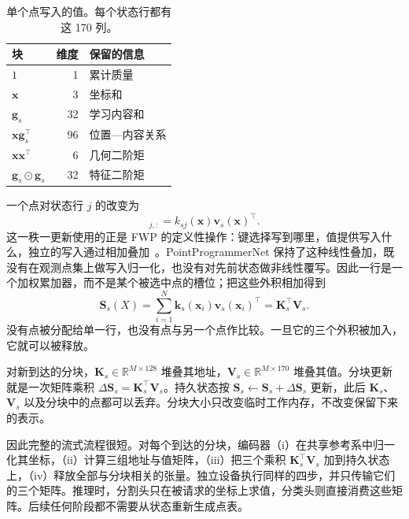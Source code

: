 \documentclass[UTF8,a4paper,11pt,fontset=windows]{ctexart}
\newcommand{\R}{\mathbb{R}}
\newcommand{\Sstate}{\mathbf{S}}
\begin{document}
\begin{table}[t]
\centering
\caption{单个点写入的值。每个状态行都有这 170 列。}
\label{tab:value-layout-cn}
\begin{tabular}{lrl}
\toprule
块 & 维度 & 保留的信息 \\
\midrule
$1$ & 1 & 累计质量 \\
$\bm x$ & 3 & 坐标和 \\
$\bm g_s$ & 32 & 学习内容和 \\
$\bm x\bm g_s^\top$ & 96 & 位置—内容关系 \\
$\bm x\bm x^\top$ & 6 & 几何二阶矩 \\
$\bm g_s\odot\bm g_s$ & 32 & 特征二阶矩 \\
\bottomrule
\end{tabular}
\end{table}

一个点对状态行 $j$ 的改变为
\begin{equation}
[\Delta\Sstate_s(\bm x)]_{j,:}=k_{sj}(\bm x)\bm v_s(\bm x)^\top .
\label{eq:single-write-cn}
\end{equation}
这一秩一更新使用的正是 FWP 的定义性操作：键选择写到哪里，值提供写入什么，独立的写入通过相加叠加~\cite{schlag2021linear}。PointProgrammerNet 保持了这种线性叠加，既没有在观测点集上做写入归一化，也没有对先前状态做非线性覆写。因此一行是一个加权累加器，而不是某个被选中点的槽位；把这些外积相加得到
\begin{equation}
\Sstate_s(X)=\sum_{i=1}^{N}\bm k_s(\bm x_i)\bm v_s(\bm x_i)^\top
=\bm K_s^\top\bm V_s.
\label{eq:state-cn}
\end{equation}
没有点被分配给单一行，也没有点与另一个点作比较。一旦它的三个外积被加入，它就可以被释放。

对新到达的分块，$\bm K_s\in\R^{M\times128}$ 堆叠其地址，$\bm V_s\in\R^{M\times170}$ 堆叠其值。分块更新就是一次矩阵乘积 $\Delta\Sstate_s=\bm K_s^\top\bm V_s$。持久状态按 $\Sstate_s\leftarrow\Sstate_s+\Delta\Sstate_s$ 更新，此后 $\bm K_s$、$\bm V_s$ 以及分块中的点都可以丢弃。分块大小只改变临时工作内存，不改变保留下来的表示。

因此完整的流式流程很短。对每个到达的分块，编码器（i）在共享参考系中归一化其坐标，（ii）计算三组地址与值矩阵，（iii）把三个乘积 $\bm K_s^\top\bm V_s$ 加到持久状态上，（iv）释放全部与分块相关的张量。独立设备执行同样的四步，并只传输它们的三个矩阵。推理时，分割头只在被请求的坐标上求值，分类头则直接消费这些矩阵。后续任何阶段都不需要从状态重新生成点表。
\end{document}
